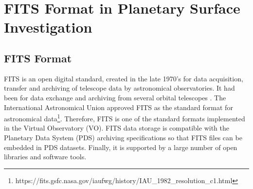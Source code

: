 \section{FITS Format in Planetary Surface Investigation}
\label{sec:fitspss}

\subsection{FITS Format}
FITS is an open digital standard, created in the late 1970's for data acquisition,
transfer and archiving of telescope data by astronomical observatories\DIFaddbegin {}\DIFaddend .
It had been \DIFdelbegin {}\DIFdelend \DIFaddbegin {}\DIFaddend for data exchange and archiving from several orbital telescopes
\DIFaddbegin {}\DIFaddend .
The International Astronomical Union approved FITS as the standard format
for astronomical data\footnote{https://fits.gsfc.nasa.gov/iaufwg/history/IAU\_1982\_resolution\_c1.html}. 
Therefore, FITS is one of the standard formats implemented in the Virtual
Observatory (VO).
FITS data storage is compatible with the Planetary Data System (PDS)
archiving specifications so that FITS files can be embedded in PDS datasets.
Finally, it is supported by a large number of open libraries
and software tools.


